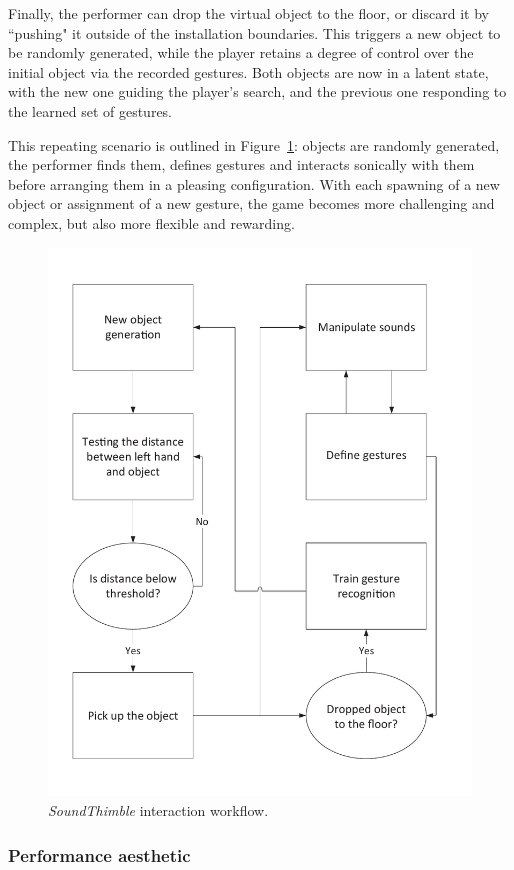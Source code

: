 \documentclass{nime-alternate}
\begin{document}
Finally, the performer can drop the virtual object to the floor, or discard it by ``pushing" it outside of the installation boundaries. This triggers a new object to be randomly generated, while the player retains a degree of control over the initial object via the recorded gestures. Both objects are now in a latent state, with the new one guiding the player's search, and the previous one responding to the learned set of gestures.

This repeating scenario is outlined in Figure~\ref{fig:concept}: objects are randomly generated, the performer finds them, defines gestures and interacts sonically with them before arranging them in a pleasing configuration. With each spawning of a new object or assignment of a new gesture, the game becomes more challenging and complex, but also more flexible and rewarding.


\begin{figure}[t]
	\centering
	\includegraphics[width=.8\columnwidth]{img/concept}
	\caption{\textit{SoundThimble} interaction workflow.}
	\label{fig:concept}
\end{figure}

\subsubsection{Performance aesthetic}
\end{document}
